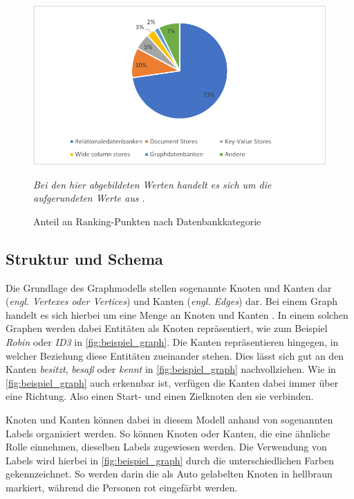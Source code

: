 \begin{figure}[ht]
    \centering
    \includegraphics[width=\textwidth]{images/marketshare_dbms.pdf}
    \caption[Anteil Ranking-Punkte nach Datenbankkategorie]{Anteil an Ranking-Punkten nach Datenbankkategorie}
    \label{fig:dbms_marketshare}
    \vspace{1em}
    \textit{Bei den hier abgebildeten Werten handelt es sich um die aufgerundeten Werte aus} \cite{db_engines_ranking_july}\textit{.}
\end{figure}

\subsection{Struktur und Schema}
\label{datenmodelle:structure}
Die Grundlage des Graphmodells stellen sogenannte Knoten und Kanten dar (\textit{engl. Vertexes oder Vertices}) und Kanten (\textit{engl. Edges}) dar. Bei einem Graph handelt es sich hierbei um eine Menge an Knoten und Kanten \cite{gdbms}. In einem solchen Graphen werden dabei Entitäten als Knoten repräsentiert, wie zum Beispiel \textit{Robin} oder \textit{ID3} in \autoref{fig:beispiel_graph}. Die Kanten repräsentieren hingegen, in welcher Beziehung diese Entitäten zueinander stehen. Dies lässt sich gut an den Kanten \textit{besitzt}, \textit{besaß} oder \textit{kennt} in \autoref{fig:beispiel_graph} nachvollziehen. Wie in \autoref{fig:beispiel_graph} auch erkennbar ist, verfügen die Kanten dabei immer über eine Richtung. Also einen Start- und einen Zielknoten den sie verbinden. 

Knoten und Kanten können dabei in diesem Modell anhand von sogenannten Labels organisiert werden. So können Knoten oder Kanten, die eine ähnliche Rolle einnehmen, dieselben Labels zugewiesen werden. Die Verwendung von Labels wird hierbei in \autoref{fig:beispiel_graph} durch die unterschiedlichen Farben gekennzeichnet. So werden darin die als Auto gelabelten Knoten in hellbraun markiert, während die Personen rot eingefärbt werden. 

